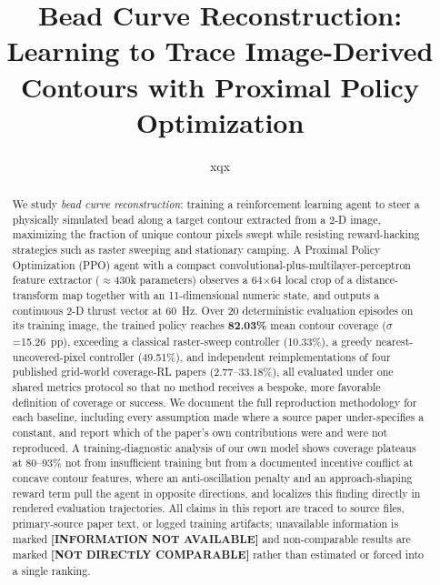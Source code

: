 \documentclass[conference]{IEEEtran}
\begin{document}
\title{Bead Curve Reconstruction: Learning to Trace Image-Derived Contours with Proximal Policy Optimization}

\author{xqx
}

\maketitle

\begin{abstract}
We study \emph{bead curve reconstruction}: training a reinforcement learning agent to steer a physically simulated bead along a target contour extracted from a 2-D image, maximizing the fraction of unique contour pixels swept while resisting reward-hacking strategies such as raster sweeping and stationary camping. A Proximal Policy Optimization (PPO) agent with a compact convolutional-plus-multilayer-perceptron feature extractor ($\approx$430k parameters) observes a 64$\times$64 local crop of a distance-transform map together with an 11-dimensional numeric state, and outputs a continuous 2-D thrust vector at 60~Hz. Over 20 deterministic evaluation episodes on its training image, the trained policy reaches \textbf{82.03\%} mean contour coverage ($\sigma$=15.26~pp), exceeding a classical raster-sweep controller (10.33\%), a greedy nearest-uncovered-pixel controller (49.51\%), and independent reimplementations of four published grid-world coverage-RL papers (2.77--33.18\%), all evaluated under one shared metrics protocol so that no method receives a bespoke, more favorable definition of coverage or success. We document the full reproduction methodology for each baseline, including every assumption made where a source paper under-specifies a constant, and report which of the paper's own contributions were and were not reproduced. A training-diagnostic analysis of our own model shows coverage plateaus at 80--93\% not from insufficient training but from a documented incentive conflict at concave contour features, where an anti-oscillation penalty and an approach-shaping reward term pull the agent in opposite directions, and localizes this finding directly in rendered evaluation trajectories. All claims in this report are traced to source files, primary-source paper text, or logged training artifacts; unavailable information is marked \textbf{[INFORMATION NOT AVAILABLE]} and non-comparable results are marked \textbf{[NOT DIRECTLY COMPARABLE]} rather than estimated or forced into a single ranking.
\end{abstract}
\end{document}
